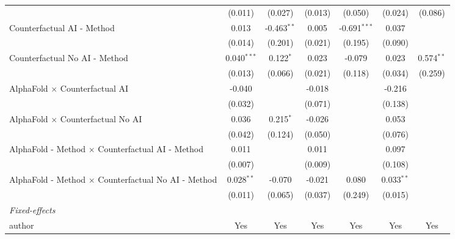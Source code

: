 \begin{tabular}{lcccccc}
                                                              & (0.011)       & (0.027)       & (0.013) & (0.050)        & (0.024)      & (0.086)\\   
   Counterfactual AI - Method                                 & 0.013         & -0.463$^{**}$ & 0.005   & -0.691$^{***}$ & 0.037        &   \\   
                                                              & (0.014)       & (0.201)       & (0.021) & (0.195)        & (0.090)      &   \\   
   Counterfactual No AI - Method                              & 0.040$^{***}$ & 0.122$^{*}$   & 0.023   & -0.079         & 0.023        & 0.574$^{**}$\\   
                                                              & (0.013)       & (0.066)       & (0.021) & (0.118)        & (0.034)      & (0.259)\\   
   AlphaFold $\times$ Counterfactual AI                       & -0.040        &               & -0.018  &                & -0.216       &   \\   
                                                              & (0.032)       &               & (0.071) &                & (0.138)      &   \\   
   AlphaFold $\times$ Counterfactual No AI                    & 0.036         & 0.215$^{*}$   & -0.026  &                & 0.053        &   \\   
                                                              & (0.042)       & (0.124)       & (0.050) &                & (0.076)      &   \\   
   AlphaFold - Method $\times$ Counterfactual AI - Method     & 0.011         &               & 0.011   &                & 0.097        &   \\   
                                                              & (0.007)       &               & (0.009) &                & (0.108)      &   \\   
   AlphaFold - Method $\times$ Counterfactual No AI - Method  & 0.028$^{**}$  & -0.070        & -0.021  & 0.080          & 0.033$^{**}$ &   \\   
                                                              & (0.011)       & (0.065)       & (0.037) & (0.249)        & (0.015)      &   \\   
   \midrule
   \emph{Fixed-effects}\\
   author                                                     & Yes           & Yes           & Yes     & Yes            & Yes          & Yes\\  

\end{tabular}
